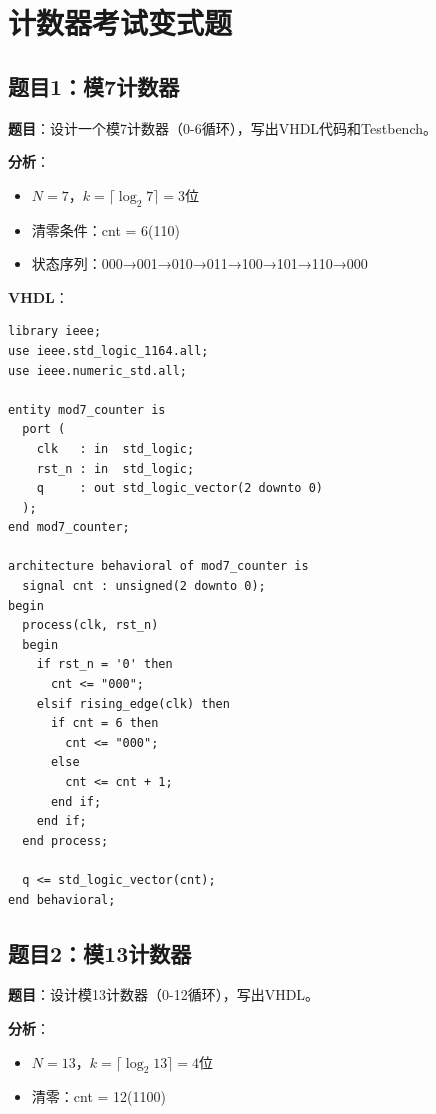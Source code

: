 \chapter{计数器考试变式题}

\section*{题目1：模7计数器}

\textbf{题目}：设计一个模7计数器（0-6循环），写出VHDL代码和Testbench。

\textbf{分析}：
\begin{itemize}
  \item $N=7$，$k=\lceil\log_2 7\rceil = 3$位
  \item 清零条件：cnt = 6(110)
  \item 状态序列：000→001→010→011→100→101→110→000
\end{itemize}

\textbf{VHDL}：
\begin{lstlisting}[caption={模7计数器（0-6循环）}]
library ieee;
use ieee.std_logic_1164.all;
use ieee.numeric_std.all;

entity mod7_counter is
  port (
    clk   : in  std_logic;
    rst_n : in  std_logic;
    q     : out std_logic_vector(2 downto 0)
  );
end mod7_counter;

architecture behavioral of mod7_counter is
  signal cnt : unsigned(2 downto 0);
begin
  process(clk, rst_n)
  begin
    if rst_n = '0' then
      cnt <= "000";
    elsif rising_edge(clk) then
      if cnt = 6 then
        cnt <= "000";
      else
        cnt <= cnt + 1;
      end if;
    end if;
  end process;

  q <= std_logic_vector(cnt);
end behavioral;
\end{lstlisting}

\section*{题目2：模13计数器}

\textbf{题目}：设计模13计数器（0-12循环），写出VHDL。

\textbf{分析}：
\begin{itemize}
  \item $N=13$，$k=\lceil\log_2 13\rceil = 4$位
  \item 清零：cnt = 12(1100)
\end{itemize}

